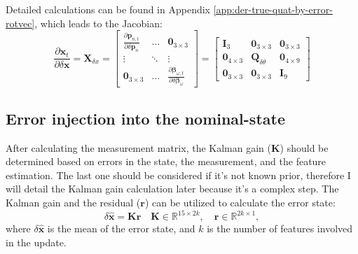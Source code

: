 Detailed calculations can be found in Appendix \ref{app:der-true-quat-by-error-rotvec}, which leads to the Jacobian:
\begin{equation}
    \frac{\partial\mathbf{x}_t}{\partial\delta\mathbf{x}} = \mathbf{X}_{\delta x}=\begin{bmatrix}
        \frac{\partial\mathbf{p}_{n,t}}{\partial\delta\mathbf{p}_n} & \dots & \mathbf{0}_{3\times 3} \\ \vdots & \ddots & \vdots \\
        \mathbf{0}_{3\times 3} & \dots & \frac{\partial\boldsymbol{\beta}_{\omega, t}}{\partial\delta\boldsymbol{\beta}_{\omega}}
    \end{bmatrix} = \begin{bmatrix}
        \mathbf{I}_3 & \mathbf{0}_{3\times 3} & \mathbf{0}_{3\times 3} \\
        \mathbf{0}_{4\times 3} & \mathbf{Q}_{\delta\theta} & \mathbf{0}_{4\times 9} \\
        \mathbf{0}_{3\times 3} & \mathbf{0}_{3\times 3} & \mathbf{I}_{9}
    \end{bmatrix}
\end{equation}

\subsection{Error injection into the nominal-state}

After calculating the measurement matrix, the Kalman gain ($\mathbf{K}$) should be determined based on errors in the state, the measurement, and the feature estimation. The last one should be considered if it's not known prior, therefore I will detail the Kalman gain calculation later because it's a complex step. The Kalman gain and the residual ($\mathbf{r}$) can be utilized to calculate the error state:
\begin{equation}
    \delta\hat{\mathbf{x}} = \mathbf{K}\mathbf{r} \quad \mathbf{K}\in\mathbb{R}^{15\times 2k},\quad\mathbf{r}\in\mathbb{R}^{2k\times 1},
\end{equation}
where $\delta\hat{\mathbf{x}}$ is the mean of the error state, and $k$ is the number of features involved in the update.

